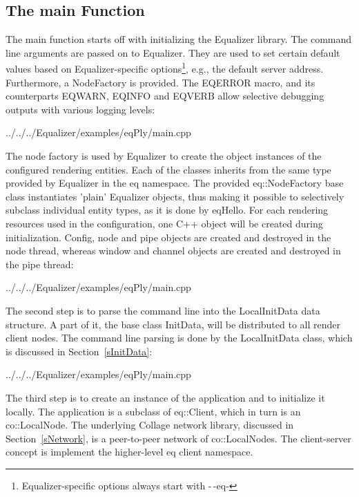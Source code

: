 \documentclass[10pt,a4]{scrartcl}
\newcommand{\sref}[1]{Section~\ref{#1}}
\begin{document}
\subsection{The main Function}

The main function starts off with initializing the Equalizer library. The
command line arguments are passed on to Equalizer. They are used to set certain
default values based on Equalizer-specific options\footnote{Equalizer-specific
  options always start with -\,-eq-}, e.g., the default server
address. Furthermore, a \textsf{NodeFactory} is provided. The \textsf{EQERROR}
macro, and its counterparts \textsf{EQWARN}, \textsf{EQINFO} and \textsf{EQVERB}
allow selective debugging outputs with various logging levels:

{\footnotesize
  {../../../Equalizer/examples/eqPly/main.cpp}}

The node factory is used by Equalizer to create the object instances of
the configured rendering entities. Each of the classes inherits from the
same type provided by Equalizer in the \textsf{eq} namespace. The
provided \textsf{eq::NodeFactory} base class instantiates 'plain'
Equalizer objects, thus making it possible to selectively subclass
individual entity types, as it is done by \textsf{eqHello}. For each
rendering resources used in the configuration, one C++ object will be
created during initialization. Config, node and pipe objects are created and
destroyed in the node thread, whereas window and channel objects are
created and destroyed in the pipe thread:

{\footnotesize
  {../../../Equalizer/examples/eqPly/main.cpp}}

The second step is to parse the command line into the
\textsf{LocalInitData} data structure. A part of it, the base class
\textsf{InitData}, will be distributed to all render client nodes. The
command line parsing is done by the \textsf{LocalInitData} class, which
is discussed in \sref{sInitData}:

{\footnotesize
  {../../../Equalizer/examples/eqPly/main.cpp}}

The third step is to create an instance of the application and to initialize it
locally. The application is a subclass of \textsf{eq::Client}, which in turn is
an \textsf{co::LocalNode}. The underlying Collage network library, discussed in
\sref{sNetwork}, is a peer-to-peer network of \textsf{co::LocalNode}s. The
client-server concept is implement the higher-level \textsf{eq} client
namespace.
\end{document}
